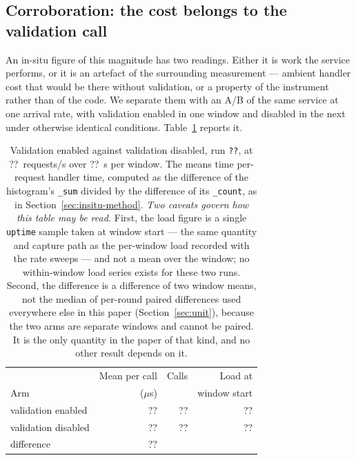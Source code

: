 \documentclass[pdflatex,sn-basic,twocolumn]{sn-jnl}%
\providecommand{\ABRunId}{??}          %
\providecommand{\ABRate}{??}           %
\providecommand{\ABWindowSeconds}{??}  %
\providecommand{\ABEnabledMean}{??}    %
\providecommand{\ABDisabledMean}{??}   %
\providecommand{\ABEnabledCalls}{??}   %
\providecommand{\ABDisabledCalls}{??}  %
\providecommand{\ABEnabledLoad}{??}    %
\providecommand{\ABDisabledLoad}{??}   %
\providecommand{\ABDelta}{??}          %
\providecommand{\ABQuantity}{per-request handler time}  %
\newif\ifabdata \abdatatrue
\begin{document}
\ifabdata
\subsection{Corroboration: the cost belongs to the validation
call}\label{sec:abcorroboration}

An in-situ figure of this magnitude has two readings. Either it is work the
service performs, or it is an artefact of the surrounding measurement ---
ambient handler cost that would be there without validation, or a property of
the instrument rather than of the code. We separate them with an A/B of the same
service at one arrival rate, with validation enabled in one window and disabled
in the next under otherwise identical conditions. Table~\ref{tab:ab} reports it.

\begin{table}[t]
\caption{Validation enabled against validation disabled, run
\texttt{\ABRunId}, at \ABRate~requests/s over \ABWindowSeconds~s per window.
The means time \ABQuantity, computed as the difference of the histogram's
\texttt{\_sum} divided by the difference of its \texttt{\_count}, as in
Section~\ref{sec:insitu-method}. \emph{Two caveats govern how this table may be
read.} First, the load figure is a single \texttt{uptime} sample taken at window
start --- the same quantity and capture path as the per-window load recorded
with the rate sweeps --- and not a mean over the window; no within-window load
series exists for these two runs. Second, the difference is a difference of two
window means, not the median of per-round paired differences used everywhere
else in this paper (Section~\ref{sec:unit}), because the two arms are separate
windows and cannot be paired. It is the only quantity in the paper of that kind,
and no other result depends on it.}
\label{tab:ab}
\small\setlength{\tabcolsep}{4pt}
\begin{tabular}{@{}lrrr@{}}
\toprule
            & Mean per call & Calls & Load at \\
Arm         & ($\mu$s)      &       & window start \\
\midrule
validation enabled  & \ABEnabledMean  & \ABEnabledCalls  & \ABEnabledLoad  \\
validation disabled & \ABDisabledMean & \ABDisabledCalls & \ABDisabledLoad \\
\midrule
difference          & \ABDelta        &                  &                 \\
\bottomrule
\end{tabular}
\end{table}
\end{document}
